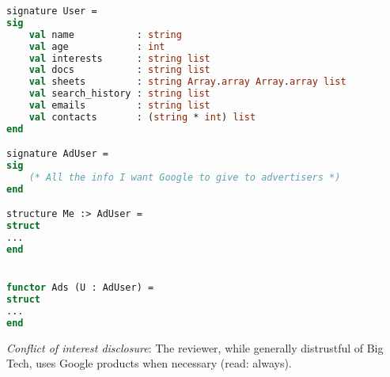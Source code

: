 \documentclass[12pt]{article}
\begin{document}
\clearpage
\begin{lstlisting}[language=ML]
signature User =
sig
    val name           : string
    val age            : int
    val interests      : string list
    val docs           : string list
    val sheets         : string Array.array Array.array list
    val search_history : string list
    val emails         : string list
    val contacts       : (string * int) list
end

signature AdUser =
sig
    (* All the info I want Google to give to advertisers *)
end

structure Me :> AdUser =
struct
...
end


functor Ads (U : AdUser) =
struct
...
end
\end{lstlisting}

\textit{Conflict of interest disclosure}: The reviewer, while generally
distrustful of Big Tech, uses Google products when necessary (read: always).
\end{document}
